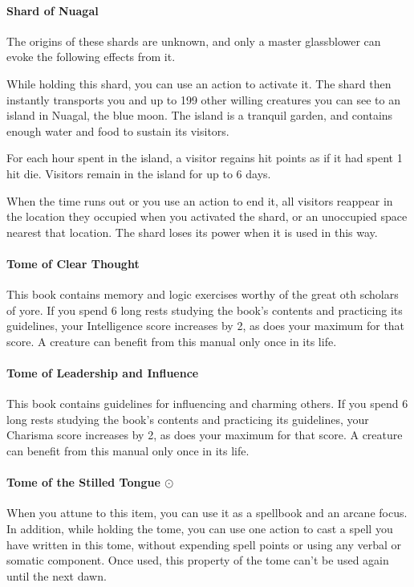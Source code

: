     \paragraph{Shard of Nuagal}
        The origins of these shards are unknown, and only a master glassblower can evoke the following effects from it.

        While holding this shard, you can use an action to activate it.
        The shard then instantly transports you and up to 199 other willing creatures you can see to an island in Nuagal, the blue moon.
        The island is a tranquil garden, and contains enough water and food to sustain its visitors.

        For each hour spent in the island, a visitor regains hit points as if it had spent 1 hit die.
        Visitors remain in the island for up to 6 days.

        When the time runs out or you use an action to end it, all visitors reappear in the location they occupied when you activated the shard, or an unoccupied space nearest that location.
        The shard loses its power when it is used in this way.
    \paragraph{Tome of Clear Thought}
        This book contains memory and logic exercises worthy of the great oth scholars of yore.
        If you spend 6 long rests studying the book's contents and practicing its guidelines, your Intelligence score increases by 2, as does your maximum for that score.
        A creature can benefit from this manual only once in its life.
    \paragraph{Tome of Leadership and Influence}
        This book contains guidelines for influencing and charming others.
        If you spend 6 long rests studying the book's contents and practicing its guidelines, your Charisma score increases by 2, as does your maximum for that score.
        A creature can benefit from this manual only once in its life.
    \paragraph{Tome of the Stilled Tongue $\odot$}
        When you attune to this item, you can use it as a spellbook and an arcane focus.
        In addition, while holding the tome, you can use one action to cast a spell you have written in this tome, without expending spell points or using any verbal or somatic component.
        Once used, this property of the tome can't be used again until the next dawn.

